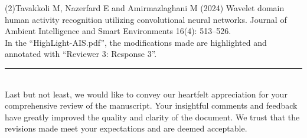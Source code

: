 \documentclass[Afour,sageh,times]{sagej}
\begin{document}
(2)Tavakkoli M, Nazerfard E and Amirmazlaghani M (2024) Wavelet domain human activity recognition utilizing convolutional
neural networks. Journal of Ambient Intelligence and Smart Environments 16(4): 513–526.\\

\textcolor{myOrange}{
In the “HighLight-AIS.pdf”, the modifications made are highlighted and annotated with “Reviewer 3: Response 3”.  
}\\

\color{gray}\rule{\linewidth}{1pt}\normalcolor\\

Last but not least, we would like to convey our heartfelt appreciation for your comprehensive review of the manuscript. Your insightful comments and feedback have greatly improved the quality and clarity of the document. We trust that the revisions made meet your expectations and are deemed acceptable.  

 
\end{document}
